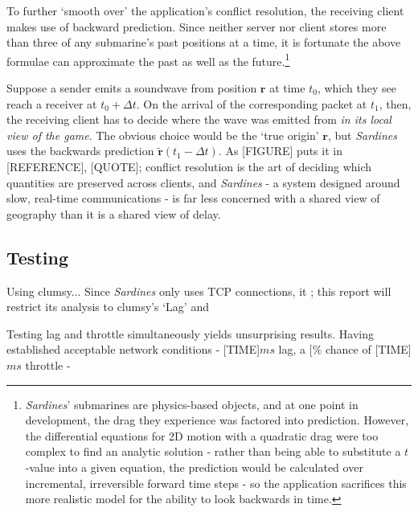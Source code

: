 \documentclass[a4paper, 10pt]{article}
\begin{document}
\begin{flushleft}
\vspace{5pt}\noindent
To further `smooth over' the application's conflict resolution, the receiving client makes use of backward prediction. Since neither server nor client stores more than three of any submarine's past positions at a time, it is fortunate the above formulae can approximate the past as well as the future.\footnote{\textit{Sardines}' submarines are physics-based objects, and at one point in development, the drag they experience was factored into prediction. However, the differential equations for 2D motion with a quadratic drag were too complex to find an analytic solution - rather than being able to substitute a $t$-value into a given equation, the prediction would be calculated over incremental, irreversible forward time steps - so the application sacrifices this more realistic model for the ability to look backwards in time.}

\vspace{5pt}\noindent
Suppose a sender emits a soundwave from position $\mathbf{r}$ at time $t_0$, which they see reach a receiver at $t_0+\Delta t$. On the arrival of the corresponding packet at $t_1$, then, the receiving client has to decide where the wave was emitted from \textit{in its local view of the game}. The obvious choice would be the `true origin' $\mathbf{r}$, but \textit{Sardines} uses the backwards prediction $\mathbf{\tilde{r}}(t_1-\Delta t)$. As [FIGURE] puts it in [REFERENCE], [QUOTE]; conflict resolution is the art of deciding which quantities are preserved across clients, and \textit{Sardines} - a system designed around slow, real-time communications - is far less concerned with a shared view of geography than it is a shared view of delay.

\subsection*{Testing}

\vspace{5pt}
Using clumsy...
Since \textit{Sardines} only uses TCP connections, it ; this report will restrict its analysis to clumsy's `Lag' and 

\vspace{5pt}\noindent
Testing lag and throttle simultaneously yields unsurprising results. Having established acceptable network conditions - [TIME]$ms$ lag, a [$\%$ chance of [TIME]$ms$ throttle -


\end{flushleft}
\end{document}
